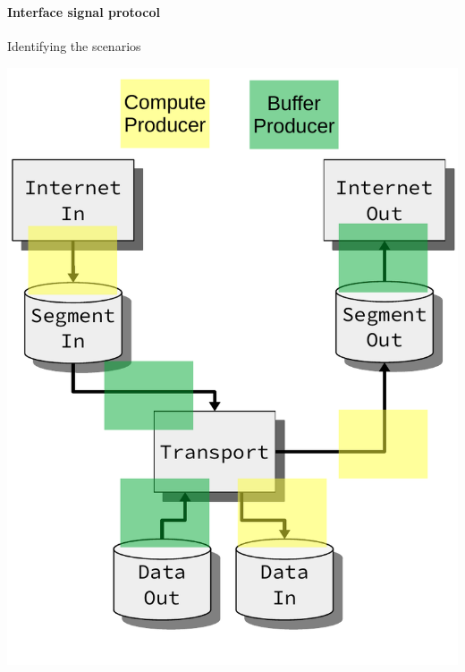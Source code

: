 \begin{frame}[fragile]
\begin{figure}[ht]
\begin{overlayarea}{0.76\textwidth}{\textheight}
        \end{overlayarea}
    \end{figure}
\end{frame}


\begin{frame}[fragile]
    \frametitle{\ImplementationTitle}
    \framesubtitle{Interface signal protocol}
Identifying the scenarios

\centering
\includegraphics[scale=0.40]{implementation/signal_protocol_identification.pdf}

\end{frame}

